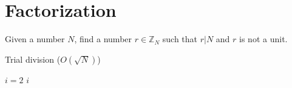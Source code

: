 \section*{Factorization}
\begin{defn}[Factorization]
Given a number $N$, find a number $r\in \mathbb{Z}_N$ such that $r|N$ and $r$ is not a unit.
\end{defn}

\begin{algorithm}\label{algo:trial}
    \caption{Trial division ($O(\sqrt{N})$)}
	$i=2$\;
\Return $i$
\end{algorithm}


